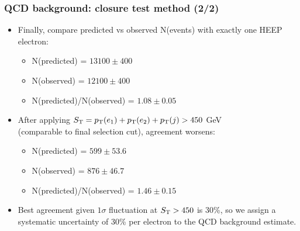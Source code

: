 \documentclass[bigger]{beamer}
\begin{document}
\begin{frame}
\frametitle{QCD background: closure test method (2/2)}
\label{sec-1-4-3}
\label{sec-1-4-3-1}

\scriptsize
\begin{itemize}
\item Finally, compare predicted vs observed N(events) with exactly one HEEP electron:
\begin{itemize}
\scriptsize
\item N(predicted) = $13100 \pm 400$
\item N(observed)  = $12100 \pm 400$
\item N(predicted)/N(observed) = $1.08 \pm 0.05$
\end{itemize}

\item After applying $S_{\text{T}} = p_{\text{T}}(e_1) + p_{\text{T}}(e_2) + p_{\text{T}}(j) > 450$ GeV \\
(comparable to final selection \ST cut), agreement worsens:
\begin{itemize}
\scriptsize
\item N(predicted) = $599 \pm 53.6$
\item N(observed)  = $876 \pm 46.7$
\item N(predicted)/N(observed) = $1.46 \pm 0.15$
\end{itemize}

\item Best agreement given $1\sigma$ fluctuation at $S_{\text{T}} > 450$ is 30\%,
so we assign a systematic uncertainty of 30\% per electron to the QCD
background estimate.
\end{itemize}
\end{frame}
\end{document}
